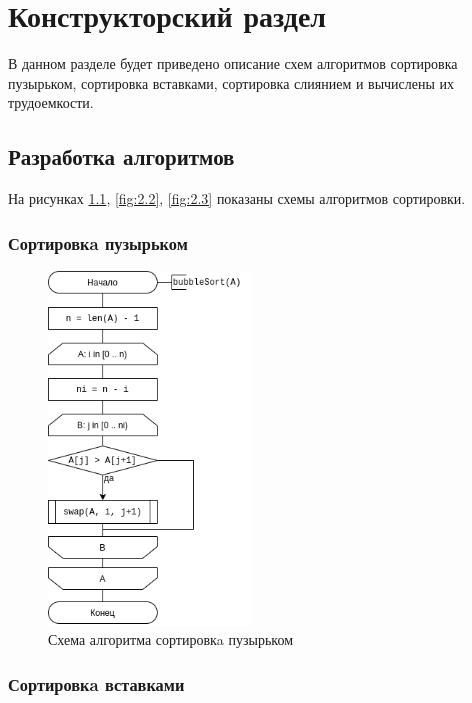 \chapter{Конструкторский раздел}
\label{cha:design}

В данном разделе будет приведено описание схем алгоритмов
сортировка пузырьком, сортировка вставками, сортировка слиянием
и вычислены их трудоемкости.

\section{Разработка алгоритмов}

На рисунках \ref{fig:2.1}, \ref{fig:2.2}, \ref{fig:2.3} показаны схемы алгоритмов сортировки.


\subsection{Сортировкa пузырьком}

\begin{figure}[h]
    \centering
    \includegraphics[width=0.48\textwidth]{3/inc/d1.png}
    \caption{Схема алгоритма сортировкa пузырьком}
    \label{fig:2.1}
\end{figure}


\newpage
\subsection{Сортировкa вставками}

